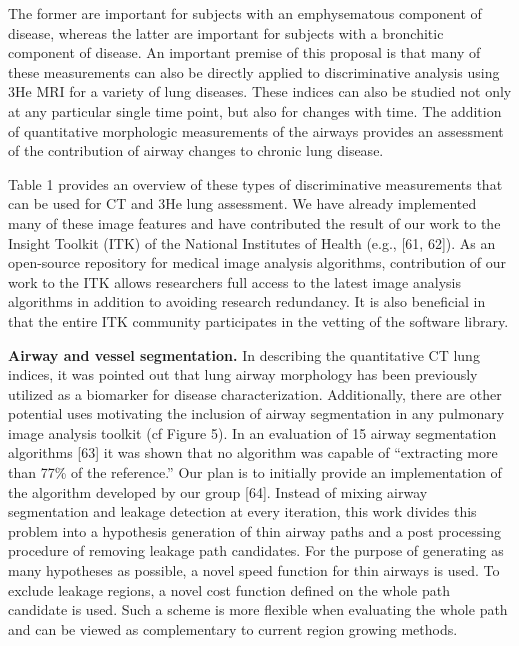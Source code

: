 \documentclass[11pt,]{article}
\begin{document}
The former are important for subjects with an emphysematous component of
disease, whereas the latter are important for subjects with a bronchitic
component of disease. An important premise of this proposal is that many
of these measurements can also be directly applied to discriminative
analysis using 3He MRI for a variety of lung diseases. These indices can
also be studied not only at any particular single time point, but also
for changes with time. The addition of quantitative morphologic
measurements of the airways provides an assessment of the contribution
of airway changes to chronic lung disease.



Table 1 provides an overview of these types of discriminative
measurements that can be used for CT and 3He lung assessment. We have
already implemented many of these image features and have contributed
the result of our work to the Insight Toolkit (ITK) of the National
Institutes of Health (e.g., {[}61, 62{]}). As an open-source repository
for medical image analysis algorithms, contribution of our work to the
ITK allows researchers full access to the latest image analysis
algorithms in addition to avoiding research redundancy. It is also
beneficial in that the entire ITK community participates in the vetting
of the software library.

\textbf{Airway and vessel segmentation.} In describing the quantitative
CT lung indices, it was pointed out that lung airway morphology has been
previously utilized as a biomarker for disease characterization.
Additionally, there are other potential uses motivating the inclusion of
airway segmentation in any pulmonary image analysis toolkit (cf Figure
5). In an evaluation of 15 airway segmentation algorithms {[}63{]} it
was shown that no algorithm was capable of ``extracting more than 77\%
of the reference.'' Our plan is to initially provide an implementation
of the algorithm developed by our group {[}64{]}. Instead of mixing
airway segmentation and leakage detection at every iteration, this work
divides this problem into a hypothesis generation of thin airway paths
and a post processing procedure of removing leakage path candidates. For
the purpose of generating as many hypotheses as possible, a novel speed
function for thin airways is used. To exclude leakage regions, a novel
cost function defined on the whole path candidate is used. Such a scheme
is more flexible when evaluating the whole path and can be viewed as
complementary to current region growing methods.
\end{document}
